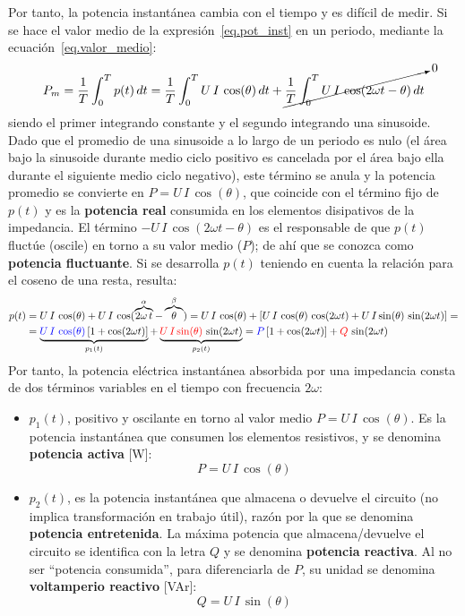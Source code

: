	Por tanto, la potencia instantánea cambia con el tiempo y es difícil de medir. Si se hace el valor medio de la expresión~\eqref{eq.pot_inst} en un periodo, mediante la ecuación~\eqref{eq.valor_medio}:
	\begin{equation*}
		P_m=\dfrac{1}{T}\int_{0}^{T}p(t)\,dt=\dfrac{1}{T}\int_{0}^{T}U\,I\,\cos(\theta)\,dt+\cancelto{0}{\dfrac{1}{T}\int_{0}^{T}U\,I\,\cos(2\omega t-\theta)\,dt}
	\end{equation*}
	siendo el primer integrando constante y el segundo integrando una sinusoide. Dado que el promedio de una sinusoide a lo largo de un periodo es nulo (el área bajo la sinusoide durante medio ciclo positivo es cancelada por el área bajo ella durante el siguiente medio ciclo negativo), este término se anula y la potencia promedio se convierte en $P=U\,I\,\cos(\theta)$, que coincide con el término fijo de $p(t)$ y es la \textbf{potencia real} consumida en los elementos disipativos de la impedancia. El término $-U\,I\,\cos(2\omega t-\theta)$ es el responsable de que $p(t)$ fluctúe (oscile) en torno a su valor medio ($P$); de ahí que se conozca como \textbf{potencia fluctuante}. Si se desarrolla $p(t)$ teniendo en cuenta la relación para el coseno de una resta, resulta: 
	\begin{align*}
		p(t)&=U\,I\,\cos(\theta)+U\,I\,\cos(\overbrace{2\omega\,t}^{\alpha}-\overbrace{\theta}^{\beta})=U\,I\,\cos(\theta)+\left[ U\,I\,\cos(\theta)\,\cos(2\omega t) + U\,I\sin(\theta)\,\sin(2\omega t)\right]=\\
		&=\underbrace{{\color{blue}U\,I\,\cos(\theta)}\left[1+\cos(2\omega t)\right]}_{p_1(t)} + \underbrace{{\color{red}U\,I\sin(\theta)}\,\sin(2\omega t)}_{p_2(t)}={\color{blue}P}\left[1+\cos(2\omega t)\right] + {\color{red}Q}\,\sin(2\omega t)
	\end{align*}
	Por tanto, la potencia eléctrica instantánea absorbida por una impedancia consta de dos términos variables en el tiempo con frecuencia $2\omega$:
	\begin{itemize}
		\item $p_1(t)$, positivo y oscilante en torno al valor medio $P=U\,I\,\cos(\theta)$. Es la potencia instantánea que consumen los elementos resistivos, y se denomina \textbf{potencia activa} [W]:
		\begin{equation}
			\boxed{P=U\,I\,\cos(\theta)}
		\end{equation}
		\item $p_2(t)$, es la potencia instantánea que almacena o devuelve el circuito (no implica transformación en trabajo útil), razón por la que se denomina \textbf{potencia entretenida}. La máxima potencia que almacena/devuelve el circuito se identifica con la letra $Q$ y se denomina \textbf{potencia reactiva}. Al no ser ``potencia consumida'', para diferenciarla de $P$, su unidad se denomina \textbf{voltamperio reactivo} [VAr]:
		\begin{equation}
			\boxed{Q=U\,I\,\sin(\theta)}
		\end{equation}
	\end{itemize}
	
